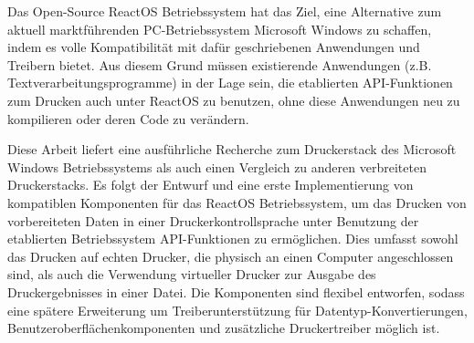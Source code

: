 Das Open-Source ReactOS Betriebssystem hat das Ziel, eine Alternative zum aktuell marktführenden PC-Betriebssystem Microsoft Windows zu schaffen, indem es volle Kompatibilität mit dafür geschriebenen Anwendungen und Treibern bietet.
Aus diesem Grund müssen existierende Anwendungen (z.B. Textverarbeitungsprogramme) in der Lage sein, die etablierten API-Funktionen zum Drucken auch unter ReactOS zu benutzen, ohne diese Anwendungen neu zu kompilieren oder deren Code zu verändern.

Diese Arbeit liefert eine ausführliche Recherche zum Druckerstack des Microsoft Windows Betriebssystems als auch einen Vergleich zu anderen verbreiteten Druckerstacks.
Es folgt der Entwurf und eine erste Implementierung von kompatiblen Komponenten für das ReactOS Betriebssystem, um das Drucken von vorbereiteten Daten in einer Druckerkontrollsprache unter Benutzung der etablierten Betriebssystem API-Funktionen zu ermöglichen.
Dies umfasst sowohl das Drucken auf echten Drucker, die physisch an einen Computer angeschlossen sind, als auch die Verwendung virtueller Drucker zur Ausgabe des Druckergebnisses in einer Datei.
Die Komponenten sind flexibel entworfen, sodass eine spätere Erweiterung um Treiberunterstützung für Datentyp-Konvertierungen, Benutzeroberflächenkomponenten und zusätzliche Druckertreiber möglich ist.
